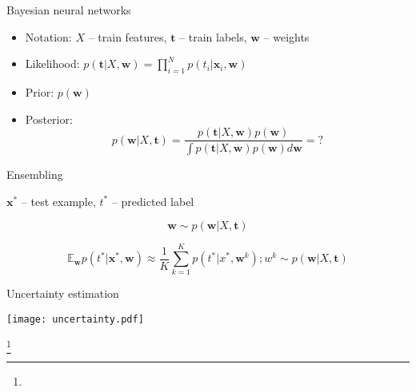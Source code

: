 \documentclass[14pt,mathserif,aspectratio=43,unicode]{beamer}
\newcommand\articlenote[1]{%
  \begingroup%
  \renewcommand\thefootnote{}\footnote{#1}%
  \addtocounter{footnote}{-1}%
  \endgroup%
}
\newcommand{\w}{\mathbf{w}}
\newcommand{\T}{\mathbf{t}}
\newcommand{\x}{\mathbf{x}}
\begin{document}
\begin{frame}{Bayesian neural networks}

    \begin{itemize}
        \item Notation: $X$ -- train features, $\T$ -- train labels, $\w$ -- weights
        \item Likelihood: $ p(\T | X, \w) = \prod_{i = 1}^N p(t_i | \mathbf{x}_i,  \w) $ \pause
        
        \item Prior: $p(\w)$ \pause
        
        \item Posterior: 
        $$ p(\w | X, \T) = \frac{p(\T|X,\w)p(\w)}{\int p(\T|X, \w) p(\w) d \w} = ? $$
    \end{itemize}

\end{frame}



\begin{frame}{Ensembling}

    $\x^*$ -- test example, $t^*$ -- predicted label

    $$ \w \sim p(\w|X, \T) $$
    
    \pause
    
    $$ \mathbb{E}_{\w} p(t^*|\x^*,\w) \approx 
        \frac{1}{K} \sum_{k=1}^K p(t^*|x^*,\w^k); w^k \sim p(\w|X, \T) $$

\end{frame}


\begin{frame}{Uncertainty estimation}

    \begin{center}
        \texttt{[image: uncertainty.pdf]}
    \end{center}

     \articlenote{}

\end{frame}
\end{document}
